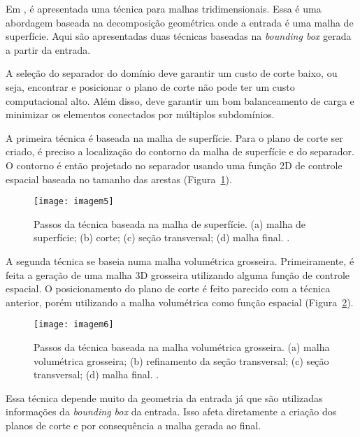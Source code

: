 Em \cite{bib:Glut08}, é apresentada uma técnica para malhas tridimensionais. Essa é uma abordagem baseada na decomposição geométrica onde a entrada é uma malha de superfície. Aqui são apresentadas duas técnicas baseadas na \textit{bounding box} gerada a partir da entrada.

A seleção do separador do domínio deve garantir um custo de corte baixo, ou seja, encontrar e posicionar o plano de corte não pode ter um custo computacional alto. Além disso, deve garantir um bom balanceamento de carga e minimizar os elementos conectados por múltiplos subdomínios.

A primeira técnica é baseada na malha de superfície. Para o plano de corte ser criado, é preciso a localização do contorno da malha de superfície e do separador. O contorno é então projetado no separador usando uma função 2D de controle espacial baseada no tamanho das arestas (Figura~\ref{fig:imagem5}).

 \begin{figure}[htbp]
     \centering
     \texttt{[image: imagem5]}
     \caption{Passos da técnica baseada na malha de superfície. (a) malha de superfície; (b) corte; (c) seção transversal; (d) malha final. \cite{bib:Glut08}.}
     \label{fig:imagem5}
 \end{figure}

A segunda técnica se baseia numa malha volumétrica grosseira. Primeiramente, é feita a geração de uma malha 3D grosseira utilizando alguma função de controle espacial. O posicionamento do plano de corte é feito parecido com a técnica anterior, porém utilizando a malha volumétrica como função espacial (Figura~\ref{fig:imagem6}).

 \begin{figure}[htbp]
     \centering
     \texttt{[image: imagem6]}
     \caption{Passos da técnica baseada na malha volumétrica grosseira. (a) malha volumétrica grosseira; (b) refinamento da seção transversal; (c) seção transversal; (d) malha final. \cite{bib:Glut08}.}
     \label{fig:imagem6}
 \end{figure}

Essa técnica depende muito da geometria da entrada já que são utilizadas informações da \textit{bounding box} da entrada. Isso afeta diretamente a criação dos planos de corte e por consequência a malha gerada ao final.

